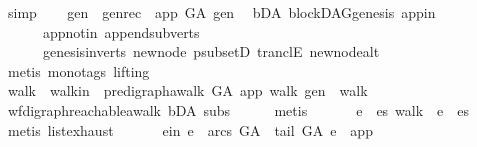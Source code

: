 \begin{isabellebody}
\ simp\isanewline
\ \ \isamarkupfalse%
\ gen\ \ gen{\isacharunderscore}{\kern0pt}rec{\isacharcolon}{\kern0pt}\ {\isachardoublequoteopen}\ app\ {\isasymrightarrow}\isactrlsup {\isacharplus}{\kern0pt}\isactrlbsub G{\isacharunderscore}{\kern0pt}A\isactrlesub \ gen{\isachardoublequoteclose}\ \isamarkupfalse%
\ bD{\isacharunderscore}{\kern0pt}A\ blockDAG{\isachardot}{\kern0pt}genesis\ app{\isacharunderscore}{\kern0pt}in\isanewline
\ \ \ \ \ \ app{\isacharunderscore}{\kern0pt}notin\ append{\isacharunderscore}{\kern0pt}subverts\isanewline
\ \ \ \ \ \ genesis{\isacharunderscore}{\kern0pt}in{\isacharunderscore}{\kern0pt}verts\ new{\isacharunderscore}{\kern0pt}node\ psubsetD\ tranclE\ new{\isacharunderscore}{\kern0pt}node{\isacharunderscore}{\kern0pt}alt\isanewline
\ \ \ \ \isamarkupfalse%
\ {\isacharparenleft}{\kern0pt}metis\ {\isacharparenleft}{\kern0pt}mono{\isacharunderscore}{\kern0pt}tags{\isacharcomma}{\kern0pt}\ lifting{\isacharparenright}{\kern0pt}{\isacharparenright}{\kern0pt}\isanewline
\ \ \isamarkupfalse%
\ \isamarkupfalse%
\ walk\ \ walk{\isacharunderscore}{\kern0pt}in{\isacharcolon}{\kern0pt}\ {\isachardoublequoteopen}\ pre{\isacharunderscore}{\kern0pt}digraph{\isachardot}{\kern0pt}awalk\ G{\isacharunderscore}{\kern0pt}A\ app\ walk\ gen\ {\isasymand}\ walk\ {\isasymnoteq}\ {\isacharbrackleft}{\kern0pt}{\isacharbrackright}{\kern0pt}{\isachardoublequoteclose}\ \isanewline
\ \ \ \ \isamarkupfalse%
\ wf{\isacharunderscore}{\kern0pt}digraph{\isachardot}{\kern0pt}reachable{}{\isacharunderscore}{\kern0pt}awalk\ bD{\isacharunderscore}{\kern0pt}A\ subs\isanewline
\ \ \ \ \isamarkupfalse%
\ metis\ \isanewline
\ \ \isamarkupfalse%
\ \isamarkupfalse%
\ e\ \ {\isachardoublequoteopen}{\isasymexists}es{\isachardot}{\kern0pt}\ walk\ {\isacharequal}{\kern0pt}\ e\ {\isacharhash}{\kern0pt}\ es{\isachardoublequoteclose}\isanewline
\ \ \ \ \isamarkupfalse%
\ {\isacharparenleft}{\kern0pt}metis\ list{\isachardot}{\kern0pt}exhaust{\isacharparenright}{\kern0pt}\ \isanewline
\ \ \isamarkupfalse%
\ \isamarkupfalse%
\ e{\isacharunderscore}{\kern0pt}in{\isacharcolon}{\kern0pt}\ {\isachardoublequoteopen}e\ {\isasymin}\ arcs\ G{\isacharunderscore}{\kern0pt}A\ {\isasymand}\ tail\ G{\isacharunderscore}{\kern0pt}A\ e\ {\isacharequal}{\kern0pt}\ app{\isachardoublequoteclose}\isanewline
\ \ \ \ \isamarkupfalse%

\end{isabellebody}
